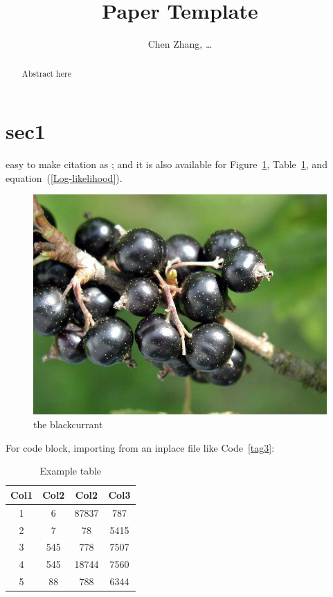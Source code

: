 \documentclass[a4paper, 12pt]{article}
\title{Paper Template}
\author{Chen Zhang, \dots}
\date{}
\newcommand{\myfig}[1]{{\color{black}#1}}
\newcommand{\myeq}[2][e]{{\color{black}#1quation~(\ref{#2})}}
\newcommand{\mytab}[1]{{\color{black}#1}}
\newcommand{\mycite}[1]{{\color{black}\cite{#1}}}
\begin{document}
\maketitle

\begin{abstract}
Abstract here
\end{abstract}

\section{sec1}

easy to make citation as \mycite{sung2021global}; and it is also available for \myfig{Figure~\ref{tag1}}, \mytab{Table~\ref{tag2}}, and \myeq{Log-likelihood}.\par

\begin{figure}[htbp]
	\includegraphics[scale=0.3]{blackcurrant.jpg}
	\caption{the blackcurrant}
	\label{tag1}
\end{figure}

For code block, importing from an inplace file like \mytab{Code~\ref{tag3}}:\par



\begin{table}[htbp]
    \begin{center}
    \caption{Example table}
    \begin{tabular}{c|c|c|c}
    \toprule
    Col1 & Col2 & Col2 & Col3 \\
    \midrule
    1 & 6 & 87837 & 787 \\ 
    \hline
    2 & 7 & 78 & 5415 \\
    \hline
    3 & 545 & 778 & 7507 \\
    \hline
    4 & 545 & 18744 & 7560 \\
    \hline
    5 & 88 & 788 & 6344 \\ [1ex] 
    \bottomrule
    \end{tabular}
    \label{tag2}
    \end{center}
\end{table}
\end{document}
